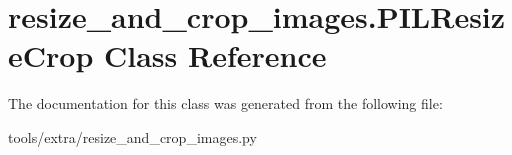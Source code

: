\hypertarget{classresize__and__crop__images_1_1_p_i_l_resize_crop}{}\section{resize\+\_\+and\+\_\+crop\+\_\+images.\+P\+I\+L\+Resize\+Crop Class Reference}
\label{classresize__and__crop__images_1_1_p_i_l_resize_crop}


The documentation for this class was generated from the following file\+:\begin{DoxyCompactItemize}
\item 
tools/extra/resize\+\_\+and\+\_\+crop\+\_\+images.\+py\end{DoxyCompactItemize}
